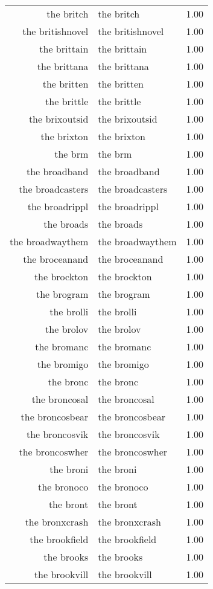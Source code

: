 \begin{table}[ht]
\begin{tabular}{rlr}
  the britch & the britch & 1.00 \\ 
  the britishnovel & the britishnovel & 1.00 \\ 
  the brittain & the brittain & 1.00 \\ 
  the brittana & the brittana & 1.00 \\ 
  the britten & the britten & 1.00 \\ 
  the brittle & the brittle & 1.00 \\ 
  the brixoutsid & the brixoutsid & 1.00 \\ 
  the brixton & the brixton & 1.00 \\ 
  the brm & the brm & 1.00 \\ 
  the broadband & the broadband & 1.00 \\ 
  the broadcasters & the broadcasters & 1.00 \\ 
  the broadrippl & the broadrippl & 1.00 \\ 
  the broads & the broads & 1.00 \\ 
  the broadwaythem & the broadwaythem & 1.00 \\ 
  the broceanand & the broceanand & 1.00 \\ 
  the brockton & the brockton & 1.00 \\ 
  the brogram & the brogram & 1.00 \\ 
  the brolli & the brolli & 1.00 \\ 
  the brolov & the brolov & 1.00 \\ 
  the bromanc & the bromanc & 1.00 \\ 
  the bromigo & the bromigo & 1.00 \\ 
  the bronc & the bronc & 1.00 \\ 
  the broncosal & the broncosal & 1.00 \\ 
  the broncosbear & the broncosbear & 1.00 \\ 
  the broncosvik & the broncosvik & 1.00 \\ 
  the broncoswher & the broncoswher & 1.00 \\ 
  the broni & the broni & 1.00 \\ 
  the bronoco & the bronoco & 1.00 \\ 
  the bront & the bront & 1.00 \\ 
  the bronxcrash & the bronxcrash & 1.00 \\ 
  the brookfield & the brookfield & 1.00 \\ 
  the brooks & the brooks & 1.00 \\ 
  the brookvill & the brookvill & 1.00 \\ 

\end{tabular}
\end{table}
